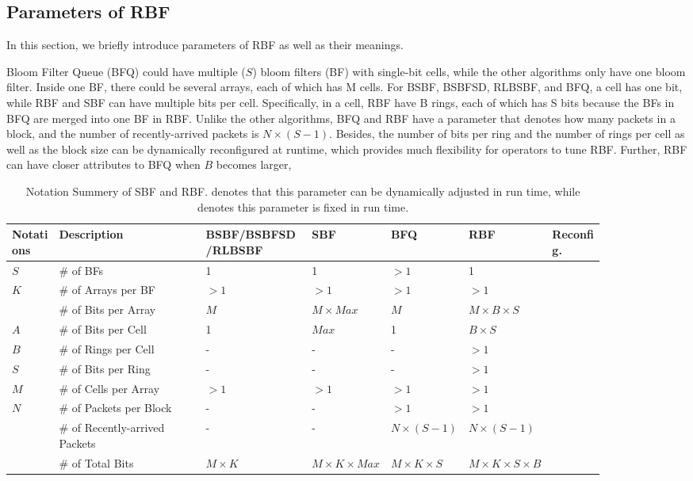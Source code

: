 \documentclass[sigconf, 10pt]{acmart}
\theoremstyle{plain}
\begin{document}
\subsection{Parameters of RBF}

In this section, we briefly introduce parameters of RBF as well as their meanings.


Bloom Filter Queue (BFQ) could have multiple ($S$) bloom filters (BF) with single-bit cells, while the other algorithms only have one bloom filter. Inside one BF, there could be several arrays, each of which has M cells. For BSBF, BSBFSD, RLBSBF, and BFQ, a cell has one bit, while RBF and SBF can have multiple bits per cell.
Specifically, in a cell, RBF have B rings, each of which has S bits because the BFs in BFQ are merged into one BF in RBF. Unlike the other algorithms, BFQ and RBF have a parameter that denotes how many packets in a block, and the number of recently-arrived packets is $N \times (S - 1)$.
Besides, the number of bits per ring and the number of rings per cell as well as the block size can be dynamically reconfigured at runtime, which provides much flexibility for operators to tune RBF.
Further, RBF can have closer attributes to BFQ when $B$ becomes larger,

\begin{table}
\caption{Notation Summery of SBF and RBF. \Y{} denotes that this parameter can be dynamically adjusted in run time, while \N{} denotes this parameter is fixed in run time.}
\label{fig:rbf-parameter}
\small
\begin{tabular}{|m{0.08\linewidth}|m{0.25\linewidth}|m{0.18\linewidth}|m{0.09\linewidth}|m{0.09\linewidth}|m{0.09\linewidth}|m{0.09\linewidth}|}

\hline
\textbf{Notations} & \textbf{Description} & \textbf{BSBF/BSBFSD/RLBSBF} & \textbf{SBF} & \textbf{BFQ} & \textbf{RBF} & \textbf{Reconfig.} \\
\hline
\hline

$S$ & \# of BFs & 1 & 1 & $>1$ & 1 & \N \\
\hline
$K$ & \# of Arrays per BF & $>1$ & $>1$ & $>1$ & $>1$ & \N \\ 
\hline
 & \# of Bits per Array & $M$ & $M \times Max $ & $M$ & $M \times B \times S$ & \N \\
\hline
$A$ & \# of Bits per Cell & 1 & $Max$ & 1  & $B \times S$ & \N \\ 
\hline
$B$ & \# of Rings per Cell & - & - & - & $>1$ & \Y \\ 
\hline
$S$ & \# of Bits per Ring & - & - & - & $>1$ & \Y \\ 
\hline
$M$ & \# of Cells per Array  & $>1$ & $>1$ & $>1$ & $>1$ & \Y \\ 
\hline
$N$ & \# of Packets per Block  & - & - & $>1$ & $>1$ & \Y \\ 
\hline
& \# of Recently-arrived Packets  & - & - & $N \times (S - 1)$ &$N \times (S - 1)$ & \Y \\
\hline
& \# of Total Bits  & $M \times K$ & $M \times K \times Max$ & $M \times K \times S$ &$M \times K \times S \times B$ & \N \\
\hline
\end{tabular}

\end{table}
\end{document}
